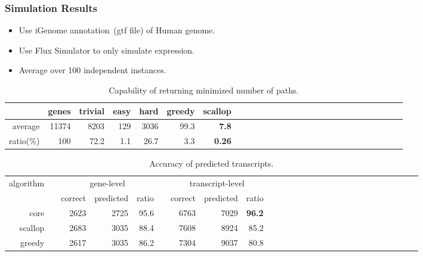 \frame
{
	\frametitle{Simulation Results}

	\begin{itemize}
	\item Use iGenome annotation~(gtf file) of Human genome.
	\item Use Flux Simulator to only simulate expression.
	\item Average over 100 independent instances.
	\end{itemize}

	\vspace{0.2cm}
	\def\SA{\hspace*{0pt}}
	\def\SC{\hspace*{-2pt}}
	\def\SB{\hspace*{1pt}}
	\def\SD{\hspace*{3pt}}

	\begin{table}
	\begin{center}%
		\setlength{\tabcolsep}{6.47pt}%
		\begin{tabular}{rrrrrrrrrrrrrrrrrrrrrrrrrrr}%
		\hline
		     & genes & trivial & easy & hard & greedy & scallop \\
		\hline
		average & 11374 & 8203 & 129 & 3036 & 99.3 & {\bf 7.8} \\
		\hline
		ratio(\%)  & 100 & 72.2  & 1.1 & 26.7 & 3.3 & {\bf 0.26} \\
		\hline
		\end{tabular}%
	\end{center}%
	\caption{Capability of returning minimized number of paths.}
	\end{table}

	\vspace{-0.2cm}
	\begin{table}
	\begin{center}%
		\setlength{\tabcolsep}{2.8pt}%
		\begin{tabular}{rrrrrrrrrrrrrrrrrrrrrrrrrrr}%
		\hline
		\multirow{2}{*}{algorithm} &\SB& \multicolumn{3}{c}{gene-level} &\SD& \multicolumn{3}{c}{transcript-level}\\
		\cline{3-5} \cline{7-9}
		     && correct & predicted & ratio && correct & predicted & ratio\\
		\hline
		core    && 2623 & 2725 & 95.6 && 6763 & 7029 & {\bf 96.2} \\
		scallop && 2683 & 3035 & 88.4 && 7608 & 8924 & 85.2 \\
		greedy  && 2617 & 3035 & 86.2 && 7304 & 9037 & 80.8 \\
		\hline
		\end{tabular}%
	\end{center}%
	\caption{Accuracy of predicted transcripts.}
	\end{table}

}


